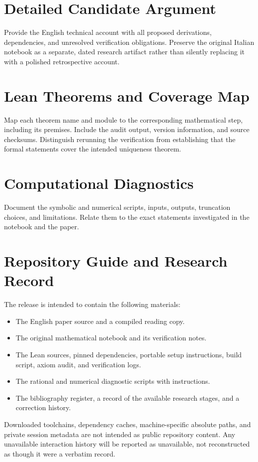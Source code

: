\documentclass[11pt,a4paper]{article}
\begin{document}
\appendix
\section{Detailed Candidate Argument}\label{app:proof}
Provide the English technical account with all proposed derivations,
dependencies, and unresolved verification obligations. Preserve the original
Italian notebook as a separate, dated research artifact rather than silently
replacing it with a polished retrospective account.

\section{Lean Theorems and Coverage Map}
Map each theorem name and module to the corresponding mathematical step,
including its premises. Include the audit output, version information, and
source checksums. Distinguish rerunning the verification from establishing
that the formal statements cover the intended uniqueness theorem.

\section{Computational Diagnostics}
Document the symbolic and numerical scripts, inputs, outputs, truncation
choices, and limitations. Relate them to the exact statements investigated
in the notebook and the paper.

\section{Repository Guide and Research Record}
The release is intended to contain the following materials:
\begin{itemize}
\item The English paper source and a compiled reading copy.
\item The original mathematical notebook and its verification notes.
\item The Lean sources, pinned dependencies, portable setup instructions,
      build script, axiom audit, and verification logs.
\item The rational and numerical diagnostic scripts with instructions.
\item The bibliography register, a record of the available research stages,
      and a correction history.
\end{itemize}
Downloaded toolchains, dependency caches, machine-specific absolute paths,
and private session metadata are not intended as public repository content.
Any unavailable interaction history will be reported as unavailable, not
reconstructed as though it were a verbatim record.
\end{document}
